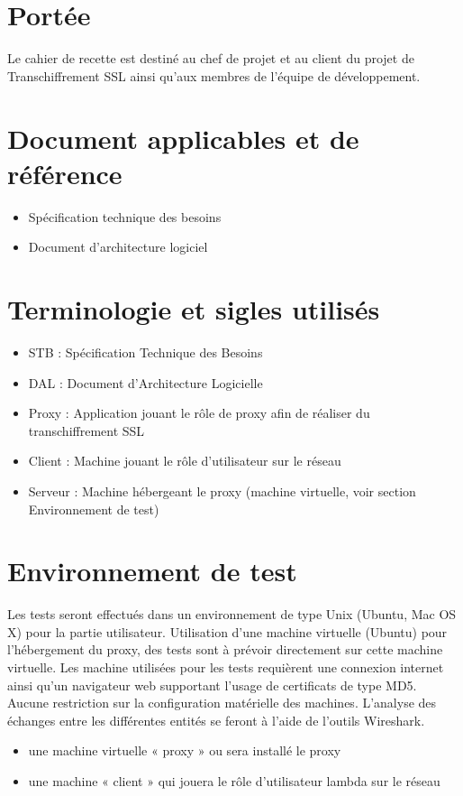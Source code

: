 \documentclass[a4paper,11pt,french]{article}
\begin{document}
\section{Portée}
Le cahier de recette est destiné au chef de projet et au client du projet de
Transchiffrement SSL ainsi qu’aux membres de l’équipe de développement.


\section{Document applicables et de référence}

\begin{itemize}
  \item Spécification technique des besoins
  \item Document d'architecture logiciel
\end{itemize}

\section{Terminologie et sigles utilisés}

\begin{itemize}
  \item STB : Spécification Technique des Besoins
  \item DAL : Document d’Architecture Logicielle
  \item Proxy : Application jouant le rôle de proxy afin de réaliser du transchiffrement SSL
  \item Client : Machine jouant le rôle d'utilisateur sur le réseau
  \item Serveur : Machine hébergeant le proxy (machine virtuelle, voir section Environnement de test)
\end{itemize}

\section{Environnement de test}
Les tests seront effectués dans un environnement de type Unix (Ubuntu, Mac OS 
X) pour la partie utilisateur. Utilisation d'une machine virtuelle (Ubuntu) pour l'hébergement du 
proxy, des tests sont à prévoir directement sur cette machine virtuelle. Les 
machine utilisées pour les tests requièrent une connexion internet ainsi qu'un
navigateur web supportant l'usage de certificats de type MD5. Aucune restriction 
sur la configuration matérielle des machines.
L'analyse des échanges entre les différentes entités se feront à l'aide de 
l'outils Wireshark.
\begin{itemize}
\item une machine virtuelle « proxy » ou sera installé le proxy 
\item une machine « client » qui jouera le rôle d'utilisateur lambda sur le réseau
\end{itemize}
\end{document}
